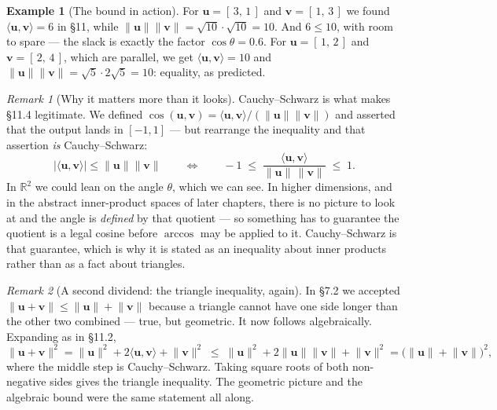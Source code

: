\documentclass[11pt]{article}
\theoremstyle{definition}
\newtheorem{ex}{Example}
\theoremstyle{remark}
\newtheorem*{rmk}{Remark}
\newcommand{\R}{\mathbb{R}}
\newcommand{\vc}[1]{\mathbf{#1}}
\newcommand{\norm}[1]{\lVert #1\rVert}
\begin{document}
\begin{ex}[The bound in action]
For $\vc{u}=[\,3,\,1\,]$ and $\vc{v}=[\,1,\,3\,]$ we found
$\langle\vc{u},\vc{v}\rangle=6$ in \S11, while
$\norm{\vc{u}}\norm{\vc{v}}=\sqrt{10}\cdot\sqrt{10}=10$. And $6\le10$, with
room to spare --- the slack is exactly the factor $\cos\theta=0.6$. For
$\vc{u}=[\,1,\,2\,]$ and $\vc{v}=[\,2,\,4\,]$, which are parallel, we get
$\langle\vc{u},\vc{v}\rangle=10$ and
$\norm{\vc{u}}\norm{\vc{v}}=\sqrt5\cdot2\sqrt5=10$: equality, as predicted.
\end{ex}

\begin{rmk}[Why it matters more than it looks]
Cauchy--Schwarz is what makes \S11.4 legitimate. We defined
$\cos(\vc{u},\vc{v})=\langle\vc{u},\vc{v}\rangle/(\norm{\vc{u}}\norm{\vc{v}})$
and asserted that the output lands in $[-1,1]$ --- but rearrange the inequality
and that assertion \emph{is} Cauchy--Schwarz:
\[
  \bigl\lvert\langle\vc{u},\vc{v}\rangle\bigr\rvert\le\norm{\vc{u}}\norm{\vc{v}}
  \qquad\Longleftrightarrow\qquad
  -1 \;\le\; \frac{\langle\vc{u},\vc{v}\rangle}{\norm{\vc{u}}\,\norm{\vc{v}}} \;\le\; 1 .
\]
In $\R^{2}$ we could lean on the angle $\theta$, which we can see. In higher
dimensions, and in the abstract inner-product spaces of later chapters, there is
no picture to look at and the angle is \emph{defined} by that quotient --- so
something has to guarantee the quotient is a legal cosine before $\arccos$ may
be applied to it. Cauchy--Schwarz is that guarantee, which is why it is stated
as an inequality about inner products rather than as a fact about triangles.
\end{rmk}

\begin{rmk}[A second dividend: the triangle inequality, again]
In \S7.2 we accepted $\norm{\vc{u}+\vc{v}}\le\norm{\vc{u}}+\norm{\vc{v}}$
because a triangle cannot have one side longer than the other two combined ---
true, but geometric. It now follows algebraically. Expanding as in \S11.2,
\[
  \norm{\vc{u}+\vc{v}}^{2}
  = \norm{\vc{u}}^{2}+2\langle\vc{u},\vc{v}\rangle+\norm{\vc{v}}^{2}
  \;\le\; \norm{\vc{u}}^{2}+2\norm{\vc{u}}\norm{\vc{v}}+\norm{\vc{v}}^{2}
  = \bigl(\norm{\vc{u}}+\norm{\vc{v}}\bigr)^{2},
\]
where the middle step is Cauchy--Schwarz. Taking square roots of both
non-negative sides gives the triangle inequality. The geometric picture and the
algebraic bound were the same statement all along.
\end{rmk}

\end{document}
